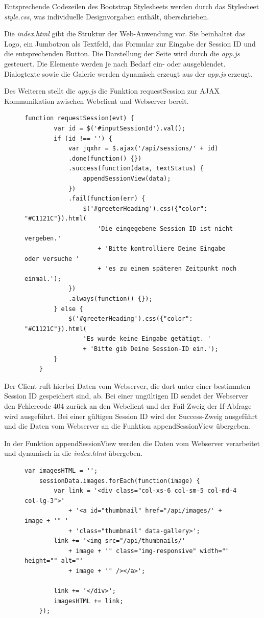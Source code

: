 Entsprechende Codezeilen des Bootstrap Stylesheets werden durch das Stylesheet \textit{style.css}, was individuelle Designvorgaben enthält, überschrieben. 

Die \textit{index.html} gibt die Struktur der Web-Anwendung vor. Sie beinhaltet das Logo, ein Jumbotron als Textfeld, das Formular zur Eingabe der Session ID und die entsprechenden Button.  Die Darstellung der Seite wird durch die \textit{app.js} gesteuert. Die Elemente werden je nach Bedarf ein- oder ausgeblendet. Dialogtexte sowie die Galerie werden dynamisch erzeugt aus der \textit{app.js} erzeugt. 

Des Weiteren stellt die \textit{app.js} die Funktion requestSession zur AJAX Kommunikation zwischen Webclient und Webserver bereit.

\begin{figure}[h]
	\begin{lstlisting}[caption={Auszug aus app.js (Webclient)}, label=list_client]
	function requestSession(evt) {
		var id = $('#inputSessionId').val();
		if (id !== '') {
		    var jqxhr = $.ajax('/api/sessions/' + id)
		    .done(function() {})
		    .success(function(data, textStatus) {
		        appendSessionView(data);
		    })
		    .fail(function(err) {
		        $('#greeterHeading').css({"color": "#C1121C"}).html(
			        'Die eingegebene Session ID ist nicht vergeben.'  
			        + 'Bitte kontrolliere Deine Eingabe oder versuche ' 
			        + 'es zu einem späteren Zeitpunkt noch einmal.');
			})
			.always(function() {});
		} else {
			$('#greeterHeading').css({"color": "#C1121C"}).html(
			    'Es wurde keine Eingabe getätigt. '
			    + 'Bitte gib Deine Session-ID ein.');
		}
	}
	\end{lstlisting}
\end{figure}

Der Client ruft hierbei Daten vom Webserver, die dort unter einer bestimmten Session ID gespeichert sind, ab. Bei einer ungültigen ID sendet der Webserver den Fehlercode 404 zurück an den Webclient und der Fail-Zweig der If-Abfrage wird ausgeführt. Bei einer gültigen Session ID wird der Success-Zweig ausgeführt und die Daten vom Webserver an die Funktion appendSessionView übergeben.

In der Funktion appendSessionView werden die Daten vom Webserver verarbeitet und dynamisch in die \textit{index.html} übergeben.

\begin{figure}[h]
	\begin{lstlisting}[caption={Auszug aus app.js (Webclient)}, label=list_client]
	var imagesHTML = '';
	sessionData.images.forEach(function(image) {
		var link = '<div class="col-xs-6 col-sm-5 col-md-4 col-lg-3">'
			+ '<a id="thumbnail" href="/api/images/' + image + '" '
			+ 'class="thumbnail" data-gallery>';
		link += '<img src="/api/thumbnails/'
			+ image + '" class="img-responsive" width="" height="" alt="' 
			+ image + '" /></a>';
	
		link += '</div>';
		imagesHTML += link;
	});
	\end{lstlisting}
\end{figure}


